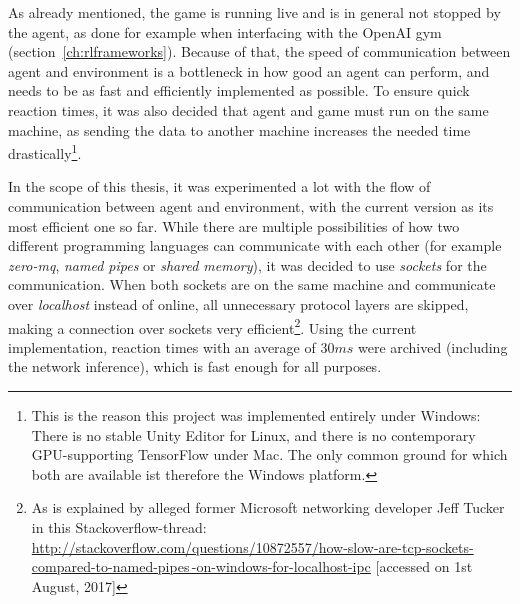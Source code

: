 \label{sec:codeCommunAgent}


As already mentioned, the game is running live and is in general not stopped by the agent, as done for example when interfacing with the OpenAI gym (section~\ref{ch:rlframeworks}). Because of that, the speed of communication between agent and environment is a bottleneck in how good an agent can perform, and needs to be as fast and efficiently implemented as possible. To ensure quick reaction times, it was also decided that agent and game must run on the same machine, as sending the data to another machine increases the needed time drastically\footnote{This is the reason this project was implemented entirely under Windows: There is no stable Unity Editor for Linux, and there is no contemporary GPU-supporting TensorFlow under Mac. The only common ground for which both are available ist therefore the Windows platform.}.

In the scope of this thesis, it was experimented a lot with the flow of communication between agent and environment, with the current version as its most efficient one so far. While there are multiple possibilities of how two different programming languages can communicate with each other (for example \textit{zero-mq}, \textit{named pipes} or \textit{shared memory}), it was decided to use \textit{sockets} for the communication. When both sockets are on the same machine and communicate over \textit{localhost} instead of online, all unnecessary protocol layers are skipped, making a connection over sockets very efficient\footnote{As is explained by alleged former Microsoft networking developer Jeff Tucker in this Stackoverflow-thread: \href{http://stackoverflow.com/questions/10872557/how-slow-are-tcp-sockets-compared-to-named-pipes-on-windows-for-localhost-ipc}{http://stackoverflow.com/questions/10872557/how-slow-are-tcp-sockets-compared-to-named-pipes\,-on-windows-for-localhost-ipc} [accessed on 1st August, 2017]}. Using the current implementation, reaction times with an average of $30ms$ were archived (including the network inference), which is fast enough for all purposes.

